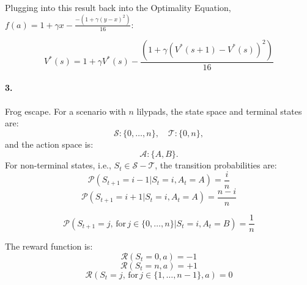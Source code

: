 \documentclass[12pt]{article}
\begin{document}
Plugging into this result back into the Optimality Equation, $f(a) = 1 + \gamma x - \frac{-(1 + \gamma (y - x)^2)}{16}$:

$$V^{*}(s) = 1 + \gamma V^{*}(s) - \frac{(1 + \gamma (V^{*}(s+1) - V^{*}(s))^2)}{16}$$

\paragraph{3.} Frog escape. For a scenario with $n$ lilypads, the state space and terminal states are: 
$$\mathcal{S} : \{0, \dots, n\}, \quad \mathcal{T} : \{0, n\},$$
and the action space is:
$$\mathcal{A} : \{A, B\}.$$ For non-terminal states, i.e., $S_t \in \mathcal{S} - \mathcal{T}$, the transition probabilities are:
$$\mathcal{P}(S_{t+1} = i-1 | S_t = i, A_t = A) = \frac{i}{n}$$
$$\mathcal{P}(S_{t+1} = i+1 | S_t = i, A_t = A) = \frac{n-i}{n}$$

$$\mathcal{P}(S_{t+1} = j,\,\mbox{for}\, j \in \{0, \dots, n\} | S_t = i, A_t = B) = \frac{1}{n}$$

The reward function is:
$$\mathcal{R}(S_t = 0, a) = -1 $$
$$\mathcal{R}(S_t = n, a) = +1 $$
$$\mathcal{R}(S_{t} = j,\,\mbox{for}\,j \in \{1, \dots, n-1\}, a) = 0 $$

\end{document}
